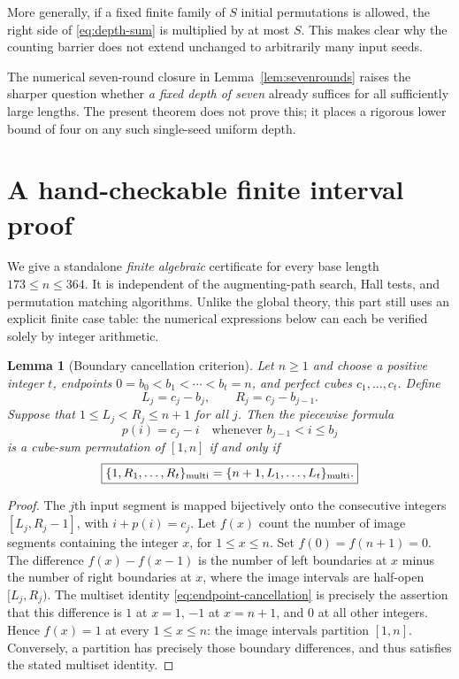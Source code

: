 \documentclass[10pt]{article}
\newtheorem{lemma}{Lemma}
\begin{document}
More generally, if a fixed finite
family of $S$ initial permutations
is allowed, the right side of
\eqref{eq:depth-sum} is multiplied
by at most $S$. This makes clear
why the counting barrier does not
extend unchanged to arbitrarily
many input seeds.

The numerical seven-round closure
in Lemma~\ref{lem:sevenrounds}
raises the sharper question whether
\emph{a fixed depth of seven} already
suffices for all sufficiently large
lengths. The present theorem does
not prove this; it places a rigorous
lower bound of four on any such
single-seed uniform depth.

\section{A hand-checkable finite interval proof}
\label{sec:finite-interval-proof}

We give a standalone \emph{finite algebraic}
certificate for every base length $173\le n\le364$.
It is independent of the augmenting-path
search, Hall tests, and permutation matching
algorithms. Unlike the global theory, this
part still uses an explicit finite case table:
the numerical expressions below can each
be verified solely by integer arithmetic.

\begin{lemma}[Boundary cancellation criterion]
\label{lem:endpoint-cancellation}
Let $n\ge1$ and choose a positive integer $t$,
endpoints $0=b_0<b_1<\cdots<b_t=n$,
and perfect cubes $c_1,\dots,c_t$.
Define
\[
L_j=c_j-b_j,\qquad R_j=c_j-b_{j-1}.
\]
Suppose that $1\le L_j<R_j\le n+1$
for all $j$. Then the piecewise formula
\[
\boxed{p(i)=c_j-i\quad
\text{whenever }b_{j-1}<i\le b_j}
\]
is a cube-sum permutation of $[1,n]$
\emph{if and only if}
\begin{equation}\label{eq:endpoint-cancellation}
\boxed{
\{1,R_1,\ldots,R_t\}_{\rm multi}
=
\{n+1,L_1,\ldots,L_t\}_{\rm multi}.}
\end{equation}
\end{lemma}
\begin{proof}
The $j$th input segment is mapped
bijectively onto the consecutive integers
$[L_j,R_j-1]$, with $i+p(i)=c_j$.
Let $f(x)$ count the number of
image segments containing the integer
$x$, for $1\le x\le n$.
Set $f(0)=f(n+1)=0$.
The difference $f(x)-f(x-1)$ is
the number of left boundaries at $x$
minus the number of right boundaries
at $x$, where the image intervals
are half-open $[L_j,R_j)$.
The multiset identity
\eqref{eq:endpoint-cancellation}
is precisely the assertion that
this difference is $1$ at $x=1$,
$-1$ at $x=n+1$, and $0$ at all
other integers. Hence $f(x)=1$
at every $1\le x\le n$:
the image intervals partition $[1,n]$.
Conversely, a partition has precisely
those boundary differences, and thus
satisfies the stated multiset identity.
\end{proof}
\end{document}
